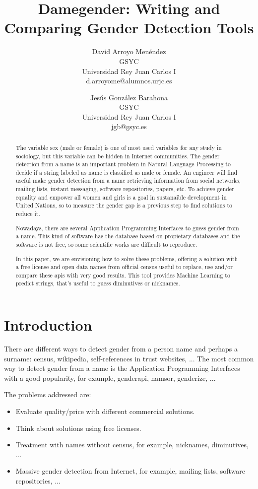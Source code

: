 \documentclass[a4paper]{article}
\title{Damegender: Writing and Comparing Gender Detection Tools}
\author{
David Arroyo Menéndez \\ GSYC \\ Universidad Rey Juan Carlos I \\ d.arroyome@alumnos.urjc.es
\and
Jesús González Barahona \\ GSYC \\ Universidad Rey Juan Carlos I \\ jgb@gsyc.es
}
\begin{document}
\maketitle

\begin{abstract}
The variable sex (male or female) is one of most used variables for
any study in sociology, but this variable can be hidden in Internet
communities. The gender detection from a name is an important problem
in Natural Language Processing to decide if a string labeled as name
is classified as male or female. An engineer will find useful
make gender detection from a name retrieving information from social
networks, mailing lists, instant messaging, software repositories,
papers, etc. To achieve gender equality and empower all women and
girls is a goal in sustanaible development in United Nations, so to
measure the gender gap is a previous step to find solutions to reduce
it.

Nowadays, there are several Application Programming Interfaces to
guess gender from a name. This kind of software has the database
based on propietary databases and the software is not free, so some
scientific works are difficult to reproduce.

In this paper, we are envisioning how to solve these problems,
offering a solution with a free license and open data names from
official census useful to replace, use and/or compare these apis with
very good results. This tool provides Machine Learning to predict
strings, that's useful to guess diminutives or nicknames.
\end{abstract}


\section{Introduction}

There are different ways to detect gender from a person name and
perhaps a surname: census, wikipedia, self-references in trust
websites, ... The most common way to detect gender from a name is the
Application Programming Interfaces with a good popularity, for
example, genderapi, namsor, genderize, ...

The problems addressed are:
\begin{itemize}
\item Evaluate quality/price with different commercial solutions.
\item Think about solutions using free licenses.
\item Treatment with names without census, for example, nicknames,
  diminutives, ...
\item Massive gender detection from Internet, for example, mailing
  lists, software repositories, ...
\end{itemize}
\end{document}
